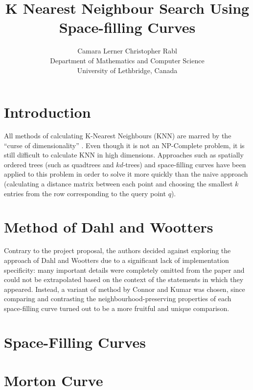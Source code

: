\documentclass[10pt]{article}
\begin{document}
\title{K Nearest Neighbour Search Using Space-filling Curves}
\author{Camara Lerner \hspace{2cm} Christopher Rabl \\
  Department of Mathematics and Computer Science \\
  University of Lethbridge, Canada}

\maketitle

\section{Introduction}

All methods of calculating K-Nearest Neighbours (KNN) are marred by the ``curse of dimensionality'' \cite{Bellman:2003}. Even though it is not an NP-Complete problem, it is still difficult to calculate KNN in high dimensions. Approaches such as spatially ordered trees (such as quadtrees and $kd$-trees) and space-filling curves have been applied to this problem in order to solve it more quickly than the naive approach (calculating a distance matrix between each point and choosing the smallest $k$ entries from the row corresponding to the query point $q$).

\section{Method of Dahl and Wootters}

Contrary to the project proposal, the authors decided against exploring the approach of Dahl and Wootters \cite{Dahl:2008} due to a significant lack of implementation specificity: many important details were completely omitted from the paper and could not be extrapolated based on the context of the statements in which they appeared. Instead, a variant of method by Connor and Kumar \cite{Connor:2010} was chosen, since comparing and contrasting the neighbourhood-preserving properties of each space-filling curve turned out to be a more fruitful and unique comparison.

\section{Space-Filling Curves}



\section{Morton Curve}
\end{document}

